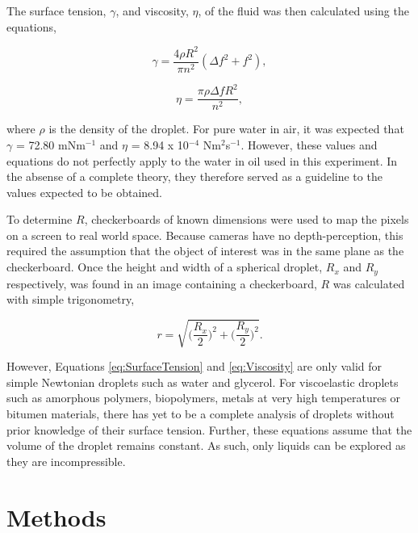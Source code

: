 \documentclass{physics_article_B}
\begin{document}
    The surface tension, $\gamma$, and viscosity, $\eta$, of the fluid was then calculated using the equations,
 
        \begin{equation} 
        \label{eq:SurfaceTension}
            \gamma = \frac{4\rho R^{2}}{\pi n^{2}}(\Delta f^{2} + f^{2}),
        \end{equation}
        
        \begin{equation} 
        \label{eq:Viscosity}
            \eta = \frac{\pi \rho \Delta f R^{2}}{n^{2}},
        \end{equation}

    where $\rho$ is the density of the droplet. For pure water in air, it was expected that\cite{expected1} $\gamma$ = 72.80 mNm$^{-1}$ and\cite{expected2} $\eta$ = 8.94 x 10$^{-4}$ Nm$^{2}$s$^{-1}$. However, these values and equations do not perfectly apply to the water in oil used in this experiment. In the absense of a complete theory, they therefore served as a guideline to the values expected to be obtained. 
    
    To determine $R$, checkerboards of known dimensions were used to map the pixels on a screen to real world space. Because cameras have no depth-perception, this required the assumption that the object of interest was in the same plane as the checkerboard. Once the height and width of a spherical droplet, $R_x$ and $R_y$ respectively, was found in an image containing a checkerboard, $R$ was calculated with simple trigonometry,
            
        \begin{equation}\label{eq:radii}
            r = \sqrt{\Big(\frac{R_x}{2}\Big)^2 + \Big(\frac{R_y}{2}\Big)^2} .
        \end{equation}

    However, Equations \ref{eq:SurfaceTension} and \ref{eq:Viscosity} are only valid for simple Newtonian droplets such as water and glycerol. For viscoelastic droplets such as amorphous polymers, biopolymers, metals at very high temperatures or bitumen materials, there has yet to be a complete analysis of droplets without prior knowledge of their surface tension. Further, these equations assume that the volume of the droplet remains constant. As such, only liquids can be explored as they are incompressible.
\section{Methods\label{sect:method}}
\end{document}
